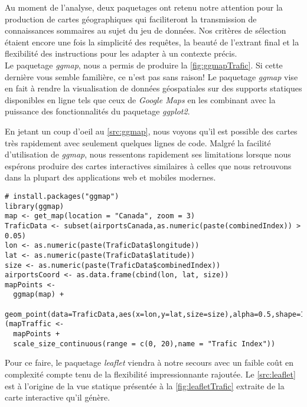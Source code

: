 \noindent
Au moment de l'analyse, deux paquetages ont retenu notre attention pour la production de cartes géographiques qui faciliteront la transmission de connaissances sommaires au sujet du jeu de données. Nos critères de sélection étaient encore une fois la simplicité des requêtes, la beauté de l'extrant final et la flexibilité des instructions pour les adapter à un contexte précis. \\

\noindent
Le paquetage \emph{ggmap}, nous a permis de produire la \autoref{fig:ggmapTrafic}. Si cette dernière vous semble familière, ce n'est pas sans raison! Le paquetage \emph{ggmap} vise en fait à rendre la visualisation de données géospatiales sur des supports statiques disponibles en ligne tels que ceux de \emph{Google Maps} en les combinant avec la puissance des fonctionnalités du paquetage \emph{ggplot2}. \cite{Rpackage:ggmap} \\


\noindent
En jetant un coup d'oeil au \autoref{src:ggmap}, nous voyons qu'il est possible des cartes très rapidement avec seulement quelques lignes de code. Malgré la facilité d'utilisation de \emph{ggmap}, nous ressentons rapidement ses limitations lorsque nous espérons produire des cartes interactives similaires à celles que nous retrouvons dans la plupart des applications web et mobiles modernes. \\

\begin{lstlisting}[caption = Générer une carte du trafic aérien avec \emph{ggmap},label=src:ggmap]
# install.packages("ggmap")
library(ggmap)
map <- get_map(location = "Canada", zoom = 3)
TraficData <- subset(airportsCanada,as.numeric(paste(combinedIndex)) > 0.05)
lon <- as.numeric(paste(TraficData$longitude))
lat <- as.numeric(paste(TraficData$latitude))
size <- as.numeric(paste(TraficData$combinedIndex))
airportsCoord <- as.data.frame(cbind(lon, lat, size))
mapPoints <- 
  ggmap(map) + 
  geom_point(data=TraficData,aes(x=lon,y=lat,size=size),alpha=0.5,shape=16)
(mapTraffic <-  
  mapPoints + 
  scale_size_continuous(range = c(0, 20),name = "Trafic Index"))
\end{lstlisting}

\vspace{\baselineskip}
\noindent
Pour ce faire, le paquetage \emph{leaflet} \cite{leaflet} viendra à notre secours avec un faible coût en complexité compte tenu de la flexibilité impressionnante rajoutée. Le \autoref{src:leaflet} est à l'origine de la vue statique présentée à la \autoref{fig:leafletTrafic} extraite de la carte interactive qu'il génère. \\

